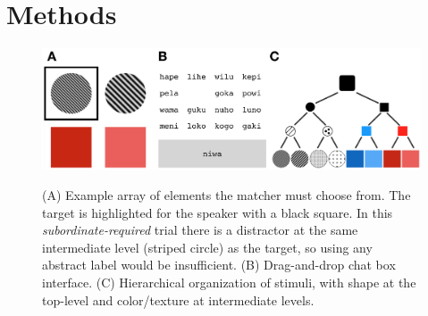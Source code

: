 \documentclass[10pt,letterpaper]{article}
\begin{document}



			
\section{Methods}

\begin{figure}[t]
\begin{center}
{\includegraphics[scale=.65]{fig.png}}
{\caption{{(A) Example array of elements the matcher must choose from. The target is highlighted for the speaker with a black square. In this \emph{subordinate-required} trial there is a distractor at the same intermediate level (striped circle) as the target, so using any abstract label would be insufficient. (B) Drag-and-drop chat box interface. (C) Hierarchical organization of stimuli, with shape at the top-level and color/texture at intermediate levels.  \label{exp}}}}
\end{center}
\end{figure}
\end{document}
